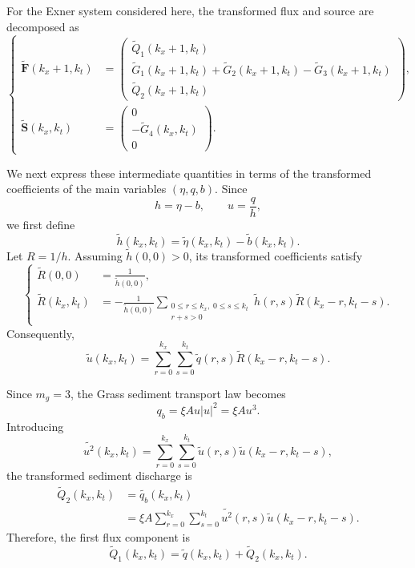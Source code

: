 \documentclass[11pt]{article}
\begin{document}
For the Exner system considered here, the transformed flux and source
are decomposed as
\begin{equation}
\left\{
\begin{aligned}
    \widetilde{\mathbf{F}}(k_x+1,k_t)
    &=
    \begin{pmatrix}
        \widetilde{Q}_1(k_x+1,k_t) \\[0.2em]
        \widetilde{G}_1(k_x+1,k_t)
        +\widetilde{G}_2(k_x+1,k_t)
        -\widetilde{G}_3(k_x+1,k_t) \\[0.2em]
        \widetilde{Q}_2(k_x+1,k_t)
    \end{pmatrix},
    \\[1em]
    \widetilde{\mathbf{S}}(k_x,k_t)
    &=
    \begin{pmatrix}
        0 \\[0.2em]
        -\widetilde{G}_4(k_x,k_t) \\[0.2em]
        0
    \end{pmatrix}.
\end{aligned}
\right.
\tag{12}
\end{equation}

We next express these intermediate quantities in terms of the
transformed coefficients of the main variables
\((\eta,q,b)\). Since
\[
    h=\eta-b,
    \qquad
    u=\frac{q}{h},
\]
we first define
\[
    \widetilde{h}(k_x,k_t)
    =
    \widetilde{\eta}(k_x,k_t)
    -
    \widetilde{b}(k_x,k_t).
\]
Let \(R=1/h\). Assuming \(\widetilde{h}(0,0)>0\), its transformed
coefficients satisfy
\[
\left\{
\begin{aligned}
    \widetilde{R}(0,0)
    &=
    \frac{1}{\widetilde{h}(0,0)},                                  \\[0.4em]
    \widetilde{R}(k_x,k_t)
    &=
    -\frac{1}{\widetilde{h}(0,0)}
    \sum_{\substack{0\leq r\leq k_x,\;0\leq s\leq k_t\\r+s>0}}
    \widetilde{h}(r,s)
    \widetilde{R}(k_x-r,k_t-s).
\end{aligned}
\right.
\]
Consequently,
\[
    \widetilde{u}(k_x,k_t)
    =
    \sum_{r=0}^{k_x}\sum_{s=0}^{k_t}
    \widetilde{q}(r,s)
    \widetilde{R}(k_x-r,k_t-s).
\]

Since \(m_g=3\), the Grass sediment transport law becomes
\[
    q_b=\xi A u|u|^2=\xi A u^3.
\]
Introducing
\[
    \widetilde{u^2}(k_x,k_t)
    =
    \sum_{r=0}^{k_x}\sum_{s=0}^{k_t}
    \widetilde{u}(r,s)
    \widetilde{u}(k_x-r,k_t-s),
\]
the transformed sediment discharge is
\begin{align*}
    \widetilde{Q}_2(k_x,k_t)
    &=
    \widetilde{q_b}(k_x,k_t)                                      \\
    &=
    \xi A
    \sum_{r=0}^{k_x}\sum_{s=0}^{k_t}
    \widetilde{u^2}(r,s)
    \widetilde{u}(k_x-r,k_t-s).
\end{align*}
Therefore, the first flux component is
\[
    \widetilde{Q}_1(k_x,k_t)
    =
    \widetilde{q}(k_x,k_t)
    +
    \widetilde{Q}_2(k_x,k_t).
\]
\end{document}
